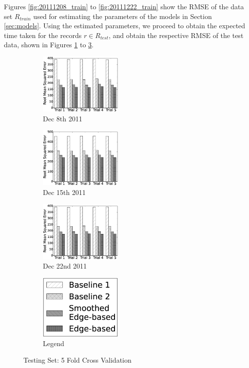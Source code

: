 \documentclass[draft]{sig-alternate}
\begin{document}
Figures \ref{fig:20111208_train} to \ref{fig:20111222_train} show the RMSE of the data set $R_{train}$ used for estimating the parameters of the models in Section \ref{sec:models}. Using the estimated parameters, we proceed to obtain the expected time taken for the records $r \in R_{test}$, and obtain the respective RMSE of the test data, shown in Figures \ref{fig:20111208_test} to \ref{fig:20111222_test}.
\begin{figure}[htb]
	\centering
	\begin{subfigure}{1.6in}
		\includegraphics[width=1.6in]{20111208_test} %
		\caption{Dec 8th 2011}
		\label{fig:20111208_test}
	\end{subfigure}
	\begin{subfigure}{1.6in}
		\includegraphics[width=1.6in]{20111215_test} %
		\caption{Dec 15th 2011}
		\label{fig:20111215_test}
	\end{subfigure}
	\begin{subfigure}{1.6in}
		\includegraphics[width=1.6in]{20111222_test} %
		\caption{Dec 22nd 2011}
		\label{fig:20111222_test}
	\end{subfigure}
	\begin{subfigure}{1.6in}
		\includegraphics[width=1.6in]{legend} %
		\caption{Legend}
		\label{fig:legend_test}
	\end{subfigure}
	\caption{Testing Set: 5 Fold Cross Validation}
	\label{fig:5_fold_test}
\end{figure}
\end{document}
